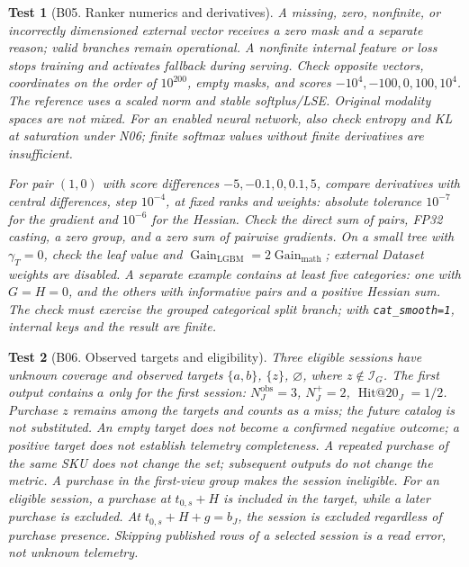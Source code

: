 \documentclass[12pt,a4paper]{article}
\newcommand{\code}[1]{{\ttfamily\small\nolinkurl{#1}}}
\theoremstyle{plainru}
\newtheorem{testcase}{Test}[section]
\begin{document}
\begin{testcase}[B05. Ranker numerics and derivatives]
A missing, zero, nonfinite, or incorrectly dimensioned external
vector receives a zero mask and a separate reason; valid branches remain operational.
A nonfinite internal feature or loss stops training
and activates fallback during serving. Check opposite
vectors, coordinates on the order of $10^{200}$, empty masks, and scores
$-10^4,-100,0,100,10^4$. The reference uses a scaled norm
and stable softplus/LSE. Original modality spaces are not mixed.
For an enabled neural network, also check entropy and KL at saturation
under N06; finite softmax values without finite derivatives are insufficient.

For pair $(1,0)$ with score differences $-5,-0.1,0,0.1,5$,
compare derivatives with central differences, step $10^{-4}$,
at fixed ranks and weights: absolute tolerance $10^{-7}$
for the gradient and $10^{-6}$ for the Hessian. Check the direct sum of pairs,
FP32 casting, a zero group, and a zero sum of pairwise gradients.
On a small tree with $\gamma_T=0$, check the leaf value and
$\operatorname{Gain}_{\mathrm{LGBM}}=2\operatorname{Gain}_{\mathrm{math}}$;
external Dataset weights are disabled.
A separate example contains at least five categories: one with $G=H=0$,
and the others with informative pairs and a positive Hessian sum.
The check must exercise the grouped categorical split branch;
with \code{cat_smooth=1}, internal keys and the result are finite.
\end{testcase}

\begin{testcase}[B06. Observed targets and eligibility]
Three eligible sessions have
unknown coverage and observed targets $\{a,b\}$, $\{z\}$,
$\varnothing$, where $z\notin\mathcal I_G$.
The first output contains $a$ only for the first session:
$N_J^{\mathrm{obs}}=3$, $N_J^+=2$,
$\operatorname{Hit@20}_J=1/2$.
Purchase $z$ remains among the targets and counts as a miss;
the future catalog is not substituted.
An empty target does not become a confirmed negative outcome;
a positive target does not establish telemetry completeness.
A repeated purchase of the same SKU does not change the set; subsequent outputs
do not change the metric. A purchase in the first-view group makes the session
ineligible. For an eligible session, a purchase at $t_{0,s}+H$
is included in the target, while a later purchase is excluded. At $t_{0,s}+H+g=b_J$, the session is excluded
regardless of purchase presence. Skipping published rows of a selected
session is a read error, not unknown telemetry.
\end{testcase}
\end{document}
